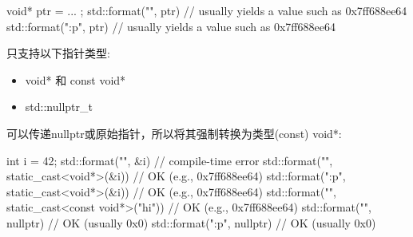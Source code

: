 \begin{cpp}
void* ptr = ... ;
std::format("{}", ptr) // usually yields a value such as 0x7ff688ee64
std::format("{:p}", ptr) // usually yields a value such as 0x7ff688ee64
\end{cpp}

只支持以下指针类型:

\begin{itemize}
\item
void* 和 const void*

\item
std::nullptr\_t
\end{itemize}

可以传递nullptr或原始指针，所以将其强制转换为类型(const) void*:

\begin{cpp}
int i = 42;
std::format("{}", &i) // compile-time error
std::format("{}", static_cast<void*>(&i)) // OK (e.g., 0x7ff688ee64)
std::format("{:p}", static_cast<void*>(&i)) // OK (e.g., 0x7ff688ee64)
std::format("{}", static_cast<const void*>("hi")) // OK (e.g., 0x7ff688ee64)
std::format("{}", nullptr) // OK (usually 0x0)
std::format("{:p}", nullptr) // OK (usually 0x0)
\end{cpp}
